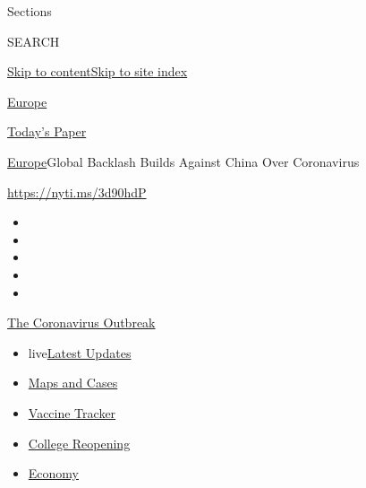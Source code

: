 Sections

SEARCH

\protect\hyperlink{site-content}{Skip to
content}\protect\hyperlink{site-index}{Skip to site index}

\href{https://www.nytimes3xbfgragh.onion/section/world/europe}{Europe}

\href{https://myaccount.nytimes3xbfgragh.onion/auth/login?response_type=cookie\&client_id=vi}{}

\href{https://www.nytimes3xbfgragh.onion/section/todayspaper}{Today's
Paper}

\href{/section/world/europe}{Europe}\textbar{}Global Backlash Builds
Against China Over Coronavirus

\url{https://nyti.ms/3d90hdP}

\begin{itemize}
\item
\item
\item
\item
\item
\end{itemize}

\href{https://www.nytimes3xbfgragh.onion/news-event/coronavirus?action=click\&pgtype=Article\&state=default\&region=TOP_BANNER\&context=storylines_menu}{The
Coronavirus Outbreak}

\begin{itemize}
\tightlist
\item
  live\href{https://www.nytimes3xbfgragh.onion/2020/08/04/world/coronavirus-cases.html?action=click\&pgtype=Article\&state=default\&region=TOP_BANNER\&context=storylines_menu}{Latest
  Updates}
\item
  \href{https://www.nytimes3xbfgragh.onion/interactive/2020/us/coronavirus-us-cases.html?action=click\&pgtype=Article\&state=default\&region=TOP_BANNER\&context=storylines_menu}{Maps
  and Cases}
\item
  \href{https://www.nytimes3xbfgragh.onion/interactive/2020/science/coronavirus-vaccine-tracker.html?action=click\&pgtype=Article\&state=default\&region=TOP_BANNER\&context=storylines_menu}{Vaccine
  Tracker}
\item
  \href{https://www.nytimes3xbfgragh.onion/2020/08/02/us/covid-college-reopening.html?action=click\&pgtype=Article\&state=default\&region=TOP_BANNER\&context=storylines_menu}{College
  Reopening}
\item
  \href{https://www.nytimes3xbfgragh.onion/live/2020/08/04/business/stock-market-today-coronavirus?action=click\&pgtype=Article\&state=default\&region=TOP_BANNER\&context=storylines_menu}{Economy}
\end{itemize}

